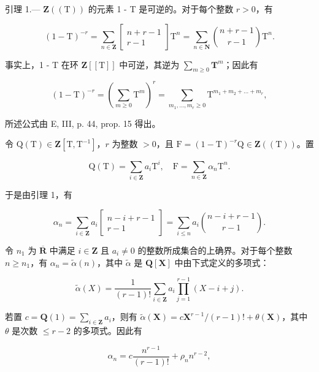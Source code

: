 引理 1.--- \(\mathbf{Z}((\mathrm{T}))\) 的元素 1 - T 是可逆的。对于每个整数 \(r > 0\)，有

\[
(1 - \mathrm{T}) ^ {- r} = \sum_ {n \in \mathbf {Z}} \left[ \begin{array}{c} n + r - 1 \\ r - 1 \end{array} \right] \mathrm{T} ^ {n} = \sum_ {n \in \mathbf {N}} \binom {n + r - 1} {r - 1} \mathrm{T} ^ {n}.
\]

事实上，1 - T 在环 \(\mathbf{Z}[[\mathrm{T}]]\) 中可逆，其逆为 \(\sum_{m\geqslant 0}\mathbf{T}^m\)；因此有

\[
(1 - \mathrm{T}) ^ {- r} = (\sum_ {m \geqslant 0} \mathrm{T} ^ {m}) ^ {r} = \sum_ {m _ {1}, \dots , m _ {r} \geqslant 0} \mathrm{T} ^ {m _ {1} + m _ {2} + \dots + m _ {r}},
\]

所述公式由 E, III, p. 44, prop. 15 得出。

令 \(\mathrm{Q}(\mathrm{T}) \in \mathbf{Z}[\mathrm{T}, \mathrm{T}^{-1}]\)，\(r\) 为整数 \(> 0\)，且 \(\mathrm{F} = (1 - \mathrm{T})^{-r}\mathrm{Q} \in \mathbf{Z}((\mathrm{T}))\)。置

\[
\mathrm{Q} (\mathrm{T}) = \sum_ {i \in \mathbf {Z}} a _ {i} \mathrm{T} ^ {i}, \quad \mathrm{F} = \sum_ {n \in \mathbf {Z}} \alpha_ {n} \mathrm{T} ^ {n}.
\]

于是由引理 1，有

\[
\alpha_ {n} = \sum_ {i \in \mathbf {Z}} a _ {i} \left[ \begin{array}{c} n - i + r - 1 \\ r - 1 \end{array} \right] = \sum_ {i \leqslant n} a _ {i} \binom {n - i + r - 1} {r - 1}.
\]

令 \(n_1\) 为 \(\overline{\mathbf{R}}\) 中满足 \(i \in \mathbf{Z}\) 且 \(a_i \neq 0\) 的整数所成集合的上确界。对于每个整数 \(n \geqslant n_1\)，有 \(\alpha_n = \tilde{\alpha}(n)\)，其中 \(\tilde{\alpha}\) 是 \(\mathbf{Q}[\mathbf{X}]\) 中由下式定义的多项式：

\[
\tilde {\alpha} (X) = \frac {1}{(r - 1) !} \sum_ {i \in \mathbf {Z}} a _ {i} \prod_ {j = 1} ^ {r - 1} (X - i + j).
\]

若置 \(c = \mathbf{Q}(1) = \sum_{i \in \mathbf{Z}} a_i\)，则有 \(\tilde{\alpha}(\mathbf{X}) = c\mathbf{X}^{r-1}/(r - 1)! + \theta(\mathbf{X})\)，其中 \(\theta\) 是次数 \(\leqslant r - 2\) 的多项式。因此有

\[
\alpha_ {n} = c \frac {n ^ {r - 1}}{(r - 1) !} + \rho_ {n} n ^ {r - 2},\tag{2}
\]

